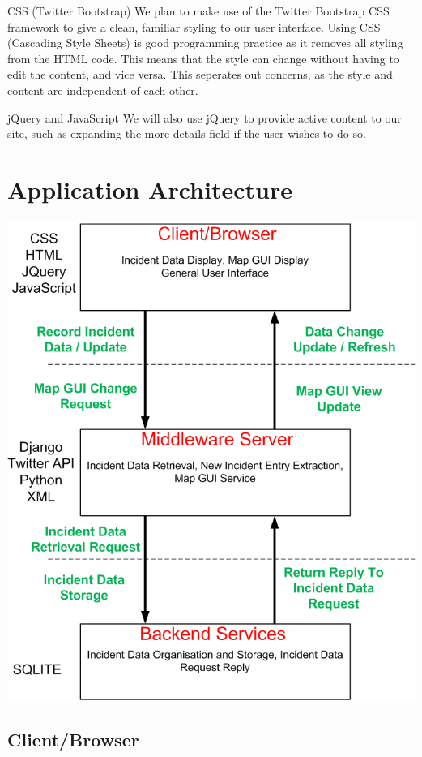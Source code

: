 \documentclass{sig-alt-release2}
\begin{document}
CSS (Twitter Bootstrap)
We plan to make use of the Twitter Bootstrap CSS framework to give a clean, familiar styling to our user interface. Using CSS (Cascading Style Sheets) is good programming practice as it removes all styling from the HTML code. This means that the style can change without having to edit the content, and vice versa. This seperates out concerns, as the style and content are independent of each other.

jQuery and JavaScript
We will also use jQuery to provide active content to our site, such as expanding the more details field if the user wishes to do so.

\newpage
\section{Application Architecture}

\begin{center}
\includegraphics[scale=0.3]{img/2.png}
\end{center}

\subsection{Client/Browser}
\end{document}
